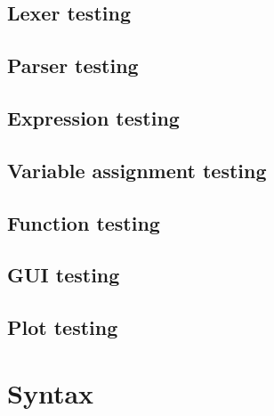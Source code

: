 \documentclass[a4paper, oneside, 11pt]{report}
\begin{document}
\section{Lexer testing}\label{sec:lexer-testing}

\section{Parser testing}\label{sec:parser-testing}

\section{Expression testing}\label{sec:arithmetic-expression-testing}

\section{Variable assignment testing}\label{sec:variable-assignment-testing}

\section{Function testing}\label{sec:function-testing}

\section{GUI testing}\label{sec:gui-testing}

\section{Plot testing}\label{sec:plot-testing}

\chapter{Syntax}\label{ch:other-stuff}
\end{document}
